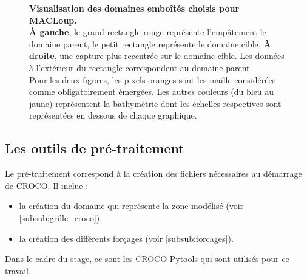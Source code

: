 \documentclass[10pt,a4paper,titlepage]{article}
\begin{document}
\begin{figure}[h!]
        \caption{
            \textbf{Visualisation des domaines emboîtés choisis pour MACLoup.}\\
            \textbf{À gauche}, le grand rectangle rouge représente l'empâtement le domaine parent, le petit rectangle représente le domaine cible.
            \textbf{À droite}, une capture plus recentrée sur le domaine cible.
            Les données à l'extérieur du rectangle correspondent au domaine parent.
            \\
            Pour les deux figures, les pixels oranges sont les maille considérées comme obligatoirement émergées.
            Les autres couleurs (du bleu au jaune) représentent la bathymétrie dont les échelles respectives sont représentées en dessous de chaque graphique.
        }
        \label{fig:imbrication}
    \end{figure}
    
    
    \subsection{Les outils de pré-traitement}
    \label{sub:outils_pretraitement}
    
    Le pré-traitement correspond à la création des fichiers nécessaires au démarrage de CROCO.
    Il inclue :
    \begin{itemize}
        \item la création du domaine qui représente la zone modélisé (voir \ref{subsub:grille_croco}),
        \item la création des différents forçages (voir \ref{subsub:forcages}).
    \end{itemize}
    
    Dans le cadre du stage, ce sont les CROCO Pytools qui sont utilisés pour ce travail.
    
\end{document}
